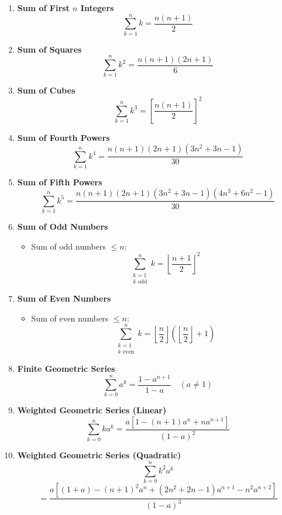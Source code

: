 \begin{enumerate}[leftmargin=*]
    \item \textbf{Sum of First $n$ Integers}
        \[\sum_{k = 1}^n k = \frac{n(n + 1)}{2}\]
    
    \item \textbf{Sum of Squares}
        \[\sum_{k = 1}^n k^2 = \frac{n(n + 1)(2n + 1)}{6}\]
    
    \item \textbf{Sum of Cubes}
        \[\sum_{k = 1}^n k^3 = \left[\frac{n(n + 1)}{2}\right]^2\]
    
    \item \textbf{Sum of Fourth Powers}
        \[\sum_{k = 1}^n k^4 = \frac{n(n + 1)(2n + 1)(3n^2 + 3n - 1)}{30}\]
    
    \item \textbf{Sum of Fifth Powers}
        \[\sum_{k = 1}^n k^5 = \frac{n(n + 1)(2n + 1)(3n^2 + 3n - 1)(4n^3 + 6n^2 - 1)}{30}\]
    
    \item \textbf{Sum of Odd Numbers}
        \begin{itemize}
            \item Sum of odd numbers $\leq n$:
            \[\sum_{\substack{k = 1 \\ k\text{ odd}}}^n k = \left\lfloor \frac{n + 1}{2} \right\rfloor^2\]
        \end{itemize}
    
    \item \textbf{Sum of Even Numbers}
        \begin{itemize}
            \item Sum of even numbers $\leq n$:
            \[\sum_{\substack{k = 1 \\ k\text{ even}}}^n k = \left\lfloor \frac{n}{2} \right\rfloor \left( \left\lfloor \frac{n}{2} \right\rfloor + 1 \right)\]
        \end{itemize}
    
    \item \textbf{Finite Geometric Series}
        \[\sum_{k = 0}^n a^k = \frac{1 - a^{n + 1}}{1 - a} \quad (a \neq 1)\]
    
    \item \textbf{Weighted Geometric Series (Linear)}
        \[\sum_{k = 0}^n k a^k = \frac{a[1 - (n + 1)a^n + n a^{n + 1}]}{(1 - a)^2}\]
    
    \item \textbf{Weighted Geometric Series (Quadratic)}
        \[\sum_{k = 0}^n k^2 a^k \]
        \[= \frac{a[(1 + a) - (n + 1)^2 a^n + (2n^2 + 2n - 1)a^{n + 1} - n^2 a^{n + 2}]}{(1 - a)^3}\]
    

\end{enumerate}
